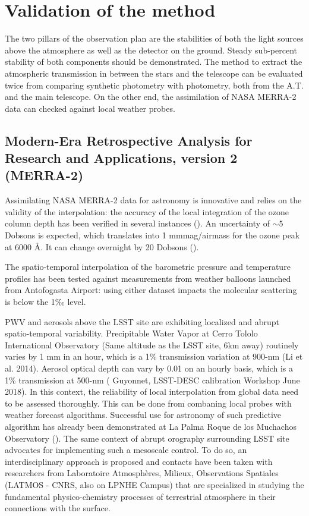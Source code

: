 \documentclass[onecolumn]{aa}
\begin{document}
\section{Validation of the method}


The two pillars of the observation plan are the stabilities of both the light sources above the atmosphere as well as the detector on the ground. Steady sub-percent stability of both components should be demonstrated. The method to extract the atmospheric transmission in between the stars and the telescope can be evaluated twice from comparing synthetic photometry with photometry, both from the A.T. and the main telescope. On the other end, the assimilation of NASA MERRA-2 data can checked against local weather probes.

\subsection{Modern-Era Retrospective Analysis for Research and Applications, version 2 (MERRA-2)}

Assimilating NASA MERRA-2 data for astronomy is innovative and relies on the validity of the interpolation: the accuracy of the local integration of the ozone column depth has been verified in several instances (\citealt{randles}). An uncertainty of $\sim 5$ Dobsons is expected, which translates into 1 mmmag/airmass for the ozone peak at 6000 Å. It can change overnight by 20 Dobsons (\citealt{buton}).

The spatio-temporal interpolation of the barometric pressure and temperature profiles has been tested against measurements from weather balloons launched from Antofogasta Airport: using either dataset impacts the molecular scattering is below the 1‰ level. 

PWV and aerosols above the LSST site are exhibiting localized and abrupt spatio-temporal variability. Precipitable Water Vapor at Cerro Tololo International Observatory (Same altitude as the LSST site, 6km away) routinely varies by 1 mm in an hour,  which is a 1\% transmission variation at 900-nm (Li et al. 2014). Aerosol optical depth can vary by 0.01 on an hourly basis, which is a 1\% transmission at 500-nm ( Guyonnet, LSST-DESC calibration Workshop June 2018). In this context, the reliability of local interpolation from global data need to be assessed thoroughly. This can be done from combaning local probes with weather forecast algorithms. Successful use for astronomy of such predictive algorithm has already been demonstrated at La Palma Roque de los Muchachos Observatory (\citealt{2018MNRAS.477.5477P}). The same context of abrupt orography surrounding LSST site advocates for implementing such a mesoscale control. To do so, an interdisciplinary approach is proposed and contacts have been taken with researchers from Laboratoire Atmosphères, Milieux, Observations Spatiales (LATMOS - CNRS, also on LPNHE Campus) that are specialized in studying the fundamental physico-chemistry processes of terrestrial atmosphere in their connections with the surface.
\end{document}
